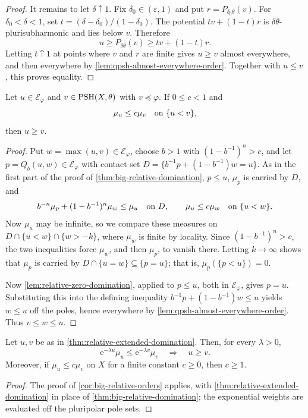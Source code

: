 \begin{proof}
It remains to let $\delta\uparrow1$. Fix $\delta_0\in(\varepsilon,1)$ and put $r=P_{\delta_0\theta}(v)$. For $\delta_0<\delta<1$, set $t=(\delta-\delta_0)/(1-\delta_0)$. The potential $t v+(1-t)r$ is $\delta\theta$-plurisubharmonic and lies below $v$. Therefore
\[
 u\geq P_{\delta\theta}(v)\geq t v+(1-t)r.
\]
Letting $t\uparrow1$ at points where $v$ and $r$ are finite gives $u\geq v$ almost everywhere, and then everywhere by \cref{lem:qpsh-almost-everywhere-order}. Together with $u\leq v$, this proves equality.
\end{proof}

\begin{theorem}\label{thm:relative-extended-domination}
Let $u\in\mathcal E_\varphi$ and $v\in\mathrm{PSH}(X,\theta)$ with $v\preceq\varphi$. If $0\leq c<1$ and
\[
 \mu_u\leq c\mu_v\quad\hbox{on }\{u<v\},
\]
then $u\geq v$.
\end{theorem}
\begin{proof}
Put $w=\max(u,v)\in\mathcal E_\varphi$, choose $b>1$ with $(1-b^{-1})^n>c$, and let $p=Q_b(u,w)\in\mathcal E_\varphi$ with contact set $D=\{b^{-1}p+(1-b^{-1})w=u\}$. As in the first part of the proof of \cref{thm:big-relative-domination}, $p\leq u$, $\mu_p$ is carried by $D$, and
\[
 b^{-n}\mu_p+(1-b^{-1})^n\mu_w\leq\mu_u
 \quad\hbox{on }D,
 \qquad
 \mu_u\leq c\mu_w\quad\hbox{on }\{u<w\}.
\]
Now $\mu_u$ may be infinite, so we compare these measures on $D\cap\{u<w\}\cap\{w>-k\}$, where $\mu_w$ is finite by locality. Since $(1-b^{-1})^n>c$, the two inequalities force $\mu_w$, and then $\mu_p$, to vanish there. Letting $k\to\infty$ shows that $\mu_p$ is carried by $D\cap\{u=w\}\subseteq\{p=u\}$; that is, $\mu_p(\{p<u\})=0$.

Now \cref{lem:relative-zero-domination}, applied to $p\leq u$, both in $\mathcal E_\varphi$, gives $p=u$. Substituting this into the defining inequality $b^{-1}p+(1-b^{-1})w\leq u$ yields $w\leq u$ off the poles, hence everywhere by \cref{lem:qpsh-almost-everywhere-order}. Thus $v\leq w\leq u$.
\end{proof}

\begin{corollary}\label{cor:relative-extended-exponential-order}\label{cor:relative-finite-exponential-order}
Let $u,v$ be as in \cref{thm:relative-extended-domination}. Then, for every $\lambda>0$,
\[
 \mathrm{e}^{-\lambda u}\mu_u\leq \mathrm{e}^{-\lambda v}\mu_v
 \quad\Longrightarrow\quad u\geq v.
\]
Moreover, if $\mu_u\leq c\mu_v$ on $X$ for a finite constant $c\geq0$, then $c\geq1$.
\end{corollary}
\begin{proof}
The proof of \cref{cor:big-relative-orders} applies, with \cref{thm:relative-extended-domination} in place of \cref{thm:big-relative-domination}; the exponential weights are evaluated off the pluripolar pole sets.
\end{proof}

